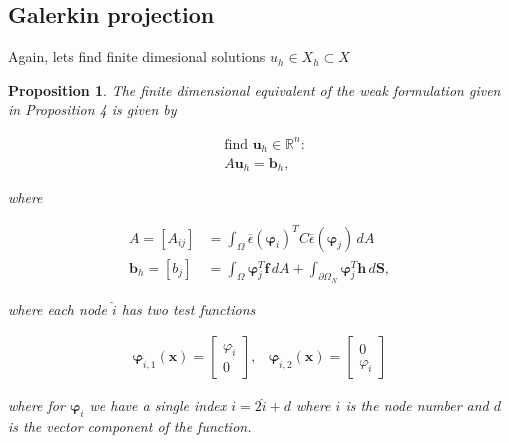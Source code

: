 \documentclass[5pt,a4paper,english]{elsarticle}%
\newtheorem{proposition}[theorem]{Proposition}
\begin{document}
\subsection{Galerkin projection}
Again, lets find finite dimesional solutions $u_h \in X_h \subset X$
\begin{proposition}
    The finite dimensional equivalent of the weak formulation given in Proposition 4 is given by


        \begin{align}
        &\text{find } \bm u_h \in \mathbb{R}^n : \\
        & A \bm u_h = \bm b_h,
        \end{align}


    where 


        \begin{align}
        A = [A_{ij}] &= \int_\Omega \overline\epsilon (\bm \varphi_i)^T C \overline \epsilon (\bm \varphi_j) \, dA \\
        \bm b_h = [b_j] &= \int_\Omega \bm \varphi_j^T \bm f \, dA + \int_{\partial \Omega_N} \bm \varphi_j^T \bm h \, d\bm S,
        \end{align}


    where each node $\hat i$ has two test functions
    
 
        \begin{align}
        \bm \varphi_{\hat i,1} (\bm x) = 
         \begin{bmatrix}
            \varphi_{\hat i}  \\
            0 
        \end{bmatrix},
        &
        \bm \varphi_{\hat i,2} (\bm x) = 
        \begin{bmatrix}
            0  \\
            \varphi_{\hat i} 
        \end{bmatrix} 
    \end{align}

    where for $\bm \varphi_i$ we have a single index $i = 2\hat i + d$ where $i$ is the node number and $d$ is the vector component of the function.
\end{proposition}
\end{document}
